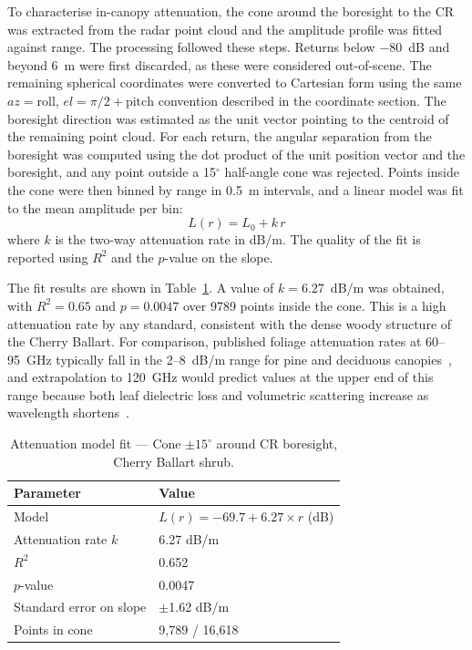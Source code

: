 To characterise in-canopy attenuation, the cone around the boresight to the CR was extracted from the radar point cloud and the amplitude profile was fitted against range. The processing followed these steps. Returns below $-80$~dB and beyond 6~m were first discarded, as these were considered out-of-scene. The remaining spherical coordinates were converted to Cartesian form using the same $az = \text{roll}$, $el = \pi/2 + \text{pitch}$ convention described in the coordinate section. The boresight direction was estimated as the unit vector pointing to the centroid of the remaining point cloud. For each return, the angular separation from the boresight was computed using the dot product of the unit position vector and the boresight, and any point outside a 15$^\circ$ half-angle cone was rejected. Points inside the cone were then binned by range in 0.5~m intervals, and a linear model was fit to the mean amplitude per bin:
\begin{equation}
    L(r) = L_0 + k \, r
    \label{eq:weissberger_ballart}
\end{equation}
where $k$ is the two-way attenuation rate in dB/m. The quality of the fit is reported using $R^2$ and the $p$-value on the slope.

The fit results are shown in Table~\ref{tab:attenuation_fit_ballart}. A value of $k = 6.27$~dB/m was obtained, with $R^2 = 0.65$ and $p = 0.0047$ over 9789 points inside the cone. This is a high attenuation rate by any standard, consistent with the dense woody structure of the Cherry Ballart. For comparison, published foliage attenuation rates at 60--95~GHz typically fall in the 2--8~dB/m range for pine and deciduous canopies~\cite{a_y_nashashibi_millimeter-wave_2004, sun2023foliage}, and extrapolation to 120~GHz would predict values at the upper end of this range because both leaf dielectric loss and volumetric scattering increase as wavelength shortens~\cite{ulaby2014microwave}.

\begin{table}[H]
\centering
\caption{Attenuation model fit --- Cone $\pm 15^{\circ}$ around CR boresight, Cherry Ballart shrub.}
\label{tab:attenuation_fit_ballart}
\begin{tabular}{ll}
\hline
\textbf{Parameter} & \textbf{Value} \\
\hline
Model                   & $L(r) = -69.7 + 6.27 \times r$ (dB) \\
Attenuation rate $k$    & 6.27 dB/m \\
$R^2$                   & 0.652 \\
$p$-value               & 0.0047 \\
Standard error on slope & $\pm$1.62 dB/m \\
Points in cone          & 9{,}789 / 16{,}618 \\
\hline
\end{tabular}
\end{table}

